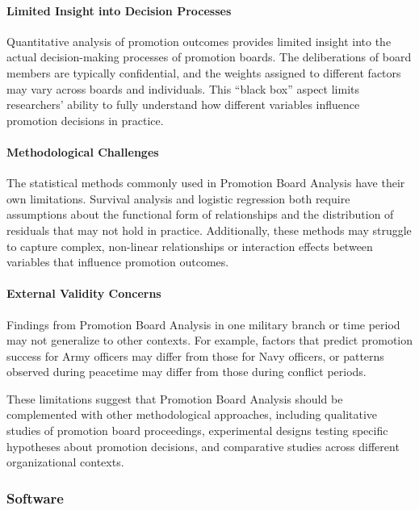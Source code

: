 \documentclass[../main.tex]{subfiles}
\begin{document}
\paragraph{Limited Insight into Decision Processes}
Quantitative analysis of promotion outcomes provides limited insight into the actual decision-making processes of promotion boards. The deliberations of board members are typically confidential, and the weights assigned to different factors may vary across boards and individuals. This ``black box'' aspect limits researchers' ability to fully understand how different variables influence promotion decisions in practice.

\paragraph{Methodological Challenges}
The statistical methods commonly used in Promotion Board Analysis have their own limitations. Survival analysis and logistic regression both require assumptions about the functional form of relationships and the distribution of residuals that may not hold in practice. Additionally, these methods may struggle to capture complex, non-linear relationships or interaction effects between variables that influence promotion outcomes.

\paragraph{External Validity Concerns}
Findings from Promotion Board Analysis in one military branch or time period may not generalize to other contexts. For example, factors that predict promotion success for Army officers may differ from those for Navy officers, or patterns observed during peacetime may differ from those during conflict periods.

These limitations suggest that Promotion Board Analysis should be complemented with other methodological approaches, including qualitative studies of promotion board proceedings, experimental designs testing specific hypotheses about promotion decisions, and comparative studies across different organizational contexts.

\subsubsection{Software}
\end{document}
